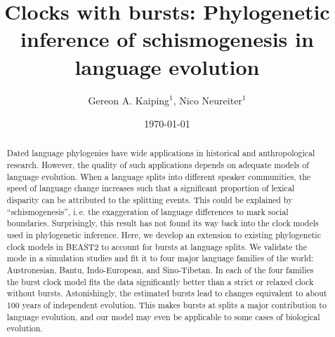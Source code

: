 \documentclass[]{rsos}%
\begin{document}
\title{Clocks with bursts: Phylogenetic inference of schismogenesis in language evolution}
\date{\today}
\author{
  Gereon A. Kaiping$^{1}$,
  Nico Neureiter$^{1}$}
\address{$^{1}$Geographic Information Science Center, Universität Zürich, CH}
\subject{Linguistics, Bioinformatics}


\begin{abstract}
Dated language phylogenies have wide applications in historical and anthropological
research. However, the quality of such applications depends on adequate models of language evolution.
When a language splits into different speaker communities, the speed of
language change increases such that a
significant proportion of lexical disparity can be attributed
to the splitting events. This could be explained by “schis\-mo\-gen\-e\-sis”, i.\,e.
the exaggeration of language differences to mark social boundaries.
Surprisingly, this result has not found its way back
into the clock models used in phylogenetic inference. Here, we develop an
extension to existing phylogenetic clock models in BEAST2 to
account for bursts at language splits. We validate the mode in a simulation studies and fit it to four major language families of the world: Austronesian,
Bantu, Indo-European, and Sino-Tibetan.
In each of the four families the burst clock model fits the data significantly better than a strict or relaxed clock without bursts. Astonishingly, the estimated bursts lead to changes equivalent to about 100 years of independent evolution. 
This makes bursts at splits a major contribution to language evolution,
and our model may even be applicable to some cases of biological evolution.
\end{abstract}
\end{document}
